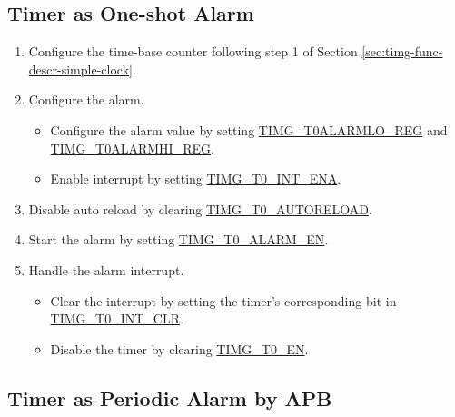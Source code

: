 \documentclass[main\_\_EN.tex]{subfiles}
\begin{document}
\subsection{Timer as One-shot Alarm}\label{sec:timg-func-descr-timer-alarm}
\begin{enumerate}
    \item Configure the time-base counter following step 1 of Section \ref{sec:timg-func-descr-simple-clock}.
    \item Configure the alarm.
    \begin{itemize}
        \item Configure the alarm value by setting \hyperref[regdesc:TIMGTXALARMLOREG]{TIMG\_T0ALARMLO\_REG} and \hyperref[regdesc:TIMGTXALARMHIREG]{TIMG\_T0ALARMHI\_REG}.
        \item Enable interrupt by setting  \hyperref[fielddesc:TIMGT0INTENA]{TIMG\_T0\_INT\_ENA}.
    \end{itemize}
    \item Disable auto reload by clearing \hyperref[fielddesc:TIMGTXAUTORELOAD]{TIMG\_T0\_AUTORELOAD}.
    \item Start the alarm by setting \hyperref[fielddesc:TIMGTXALARMEN]{TIMG\_T0\_ALARM\_EN}.
    \item Handle the alarm interrupt.
    \begin{itemize}
        \item Clear the interrupt by setting the timer's corresponding bit in \hyperref[fielddesc:TIMGT0INTCLR]{TIMG\_T0\_INT\_CLR}.
        \item Disable the timer by clearing \hyperref[fielddesc:TIMGTXEN]{TIMG\_T0\_EN}.
    \end{itemize}
\end{enumerate}

\subsection{Timer as Periodic Alarm by APB}
\end{document}
